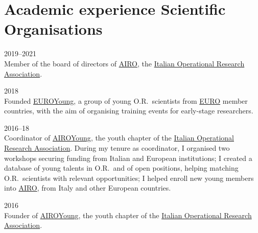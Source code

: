 \section*{Academic experience {\small Scientific Organisations}}

\begin{paracol}{2}
  2019--2021
\switchcolumn
  \\
  Member of the board of directors of \href{https://www.airo.org/}{AIRO}, the \href{https://www.airo.org/}{Italian Operational Research Association}.
\end{paracol}

\begin{paracol}{2}
  2018
\switchcolumn
  \\
  Founded \href{https://euroyoung.github.io/}{EUROYoung}, a group of young O.R.\ scientists from \href{https://www.euro-online.org}{EURO} member countries, with the aim of organising training events for early-stage researchers.
\end{paracol}

\begin{paracol}{2}
  2016--18
\switchcolumn
  \\
  Coordinator of \href{https://www.airoyoung.org/}{AIROYoung}, the youth chapter of the \href{http://www.airo.org}{Italian Operational Research Association}.
  During my tenure as coordinator, I organised two workshops securing funding from Italian and European institutions;
  I created a database of young talents in O.R.\ and of open positions, helping matching O.R.\ scientists with relevant opportunities;
  I helped enroll new young members into \href{https://www.airo.org/}{AIRO}, from Italy and other European countries.
\end{paracol}

\begin{paracol}{2}
  2016
\switchcolumn
  \\
  Founder of \href{https://www.airoyoung.org}{AIROYoung}, the youth chapter of the \href{http://www.airo.org}{Italian Operational Research Association}.
\end{paracol}